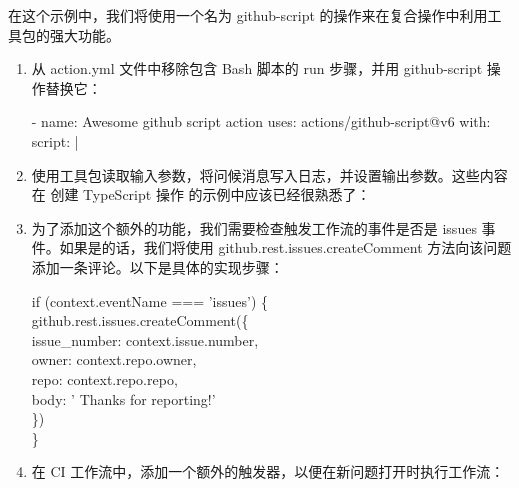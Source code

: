 在这个示例中，我们将使用一个名为 github-script 的操作来在复合操作中利用工具包的强大功能。


\begin{enumerate}
\item 
从 action.yml 文件中移除包含 Bash 脚本的 run 步骤，并用 github-script 操作替换它：

\begin{shell}
- name: Awesome github script action
  uses: actions/github-script@v6
  with:
    script: |
\end{shell}

\item 
使用工具包读取输入参数，将问候消息写入日志，并设置输出参数。这些内容在 创建 TypeScript 操作 的示例中应该已经很熟悉了：


\item 
为了添加这个额外的功能，我们需要检查触发工作流的事件是否是 issues 事件。如果是的话，我们将使用 github.rest.issues.createComment 方法向该问题添加一条评论。以下是具体的实现步骤：

\begin{tcolorbox}[ breakable,colback = bashcodebg, colframe= black!50!white]
\scriptsize{
if (context.eventName === 'issues') \{ \\
\hspace*{1em}github.rest.issues.createComment(\{ \\
\hspace*{2em}issue\_number: context.issue.number, \\
\hspace*{2em}owner: context.repo.owner, \\
\hspace*{2em}repo: context.repo.repo, \\
\hspace*{2em}body: ' Thanks for reporting!' \\
\hspace*{1em}\}) \\
\}
}
\end{tcolorbox}

\item 
在 CI 工作流中，添加一个额外的触发器，以便在新问题打开时执行工作流：


\end{enumerate}
